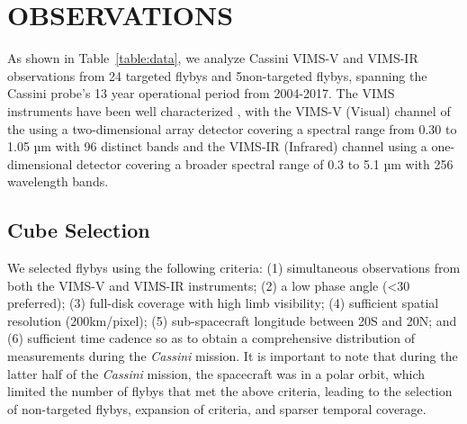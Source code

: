\documentclass[tighten,linenumbers,twocolumn]{aastex631}
\begin{document}
\section{OBSERVATIONS}
As shown in Table~\ref{table:data}, we analyze Cassini VIMS-V and VIMS-IR observations from 24 
targeted flybys and 5non-targeted flybys, spanning the Cassini probe's 13 year operational period from 2004-2017. 
The VIMS instruments have been well characterized \cite{brown2004cassini}, with the VIMS-V (Visual) channel of the using a two-dimensional array detector covering a spectral range from 0.30 to 1.05 µm with 96 distinct bands and the VIMS-IR (Infrared) channel using a one-dimensional detector covering a broader spectral range of 0.3 to 5.1 µm with 256 wavelength bands.
\subsection{Cube Selection}

We selected flybys using the following criteria: (1) simultaneous observations from both the VIMS-V and VIMS-IR instruments; (2) a low phase angle (<30\textdegree{} preferred); (3) full-disk coverage with high limb visibility; (4) sufficient spatial resolution (200km/pixel); (5) sub-spacecraft longitude between 20\textdegree{}S and 20\textdegree{}N; and (6) sufficient time cadence so as to obtain a comprehensive distribution of measurements during the \textit{Cassini} mission. It is important to note that during the latter half of the \textit{Cassini} mission, the spacecraft was in a polar orbit, which limited the number of flybys that met the above criteria, leading to the selection of non-targeted flybys, expansion of criteria, and sparser temporal coverage.

\end{document}
